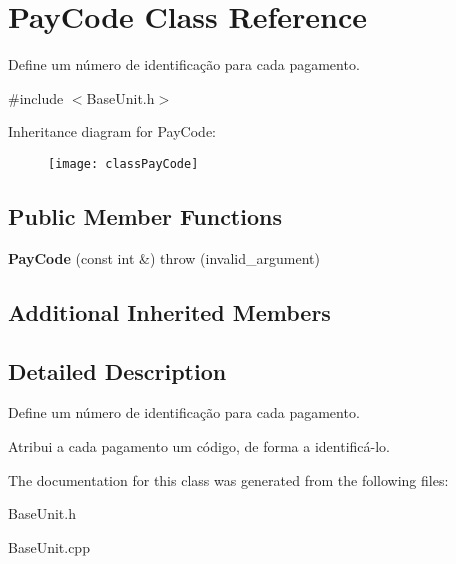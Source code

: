 \hypertarget{classPayCode}{\section{Pay\-Code Class Reference}
\label{classPayCode}
}


Define um número de identificação para cada pagamento.  




{\ttfamily \#include $<$Base\-Unit.\-h$>$}

Inheritance diagram for Pay\-Code\-:\begin{figure}[H]
\begin{center}
\leavevmode
\texttt{[image: classPayCode]}
\end{center}
\end{figure}
\subsection*{Public Member Functions}
\begin{DoxyCompactItemize}
\item 
\hypertarget{classPayCode_a919ab6e420b9bd55e8c470ea411aa97e}{{\bfseries Pay\-Code} (const int \&)  throw (invalid\-\_\-argument)}\label{classPayCode_a919ab6e420b9bd55e8c470ea411aa97e}

\end{DoxyCompactItemize}
\subsection*{Additional Inherited Members}


\subsection{Detailed Description}
Define um número de identificação para cada pagamento. 

Atribui a cada pagamento um código, de forma a identificá-\/lo. 

The documentation for this class was generated from the following files\-:\begin{DoxyCompactItemize}
\item 
Base\-Unit.\-h\item 
Base\-Unit.\-cpp\end{DoxyCompactItemize}
